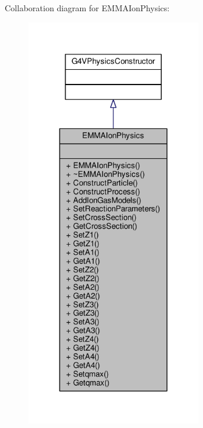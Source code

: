 Collaboration diagram for E\+M\+M\+A\+Ion\+Physics\+:
\nopagebreak
\begin{figure}[H]
\begin{center}
\leavevmode
\includegraphics[width=216pt]{classEMMAIonPhysics__coll__graph}
\end{center}
\end{figure}
